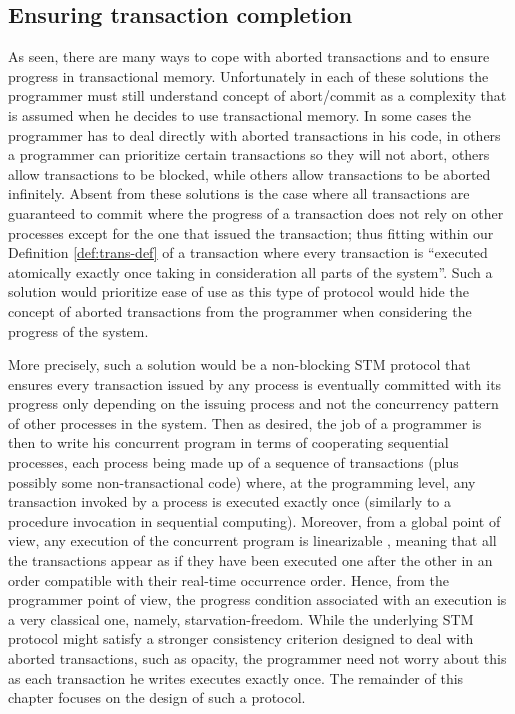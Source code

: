 \subsection{Ensuring transaction completion}
As seen, there are many ways to cope with aborted transactions
and to ensure progress in transactional memory.
Unfortunately in each of these solutions the programmer must still understand
concept of abort/commit as a complexity that is assumed when he decides to use
transactional memory.
In some cases the programmer has to deal directly with aborted transactions
in his code, in others a programmer can prioritize certain transactions
so they will not abort, others allow transactions to be blocked, while
others allow transactions to be aborted infinitely.
Absent from these solutions is the case where all transactions are guaranteed to
commit where the progress of a transaction does not rely on
other processes except for the one that issued the transaction; thus
fitting within our Definition \ref{def:trans-def} of a transaction
where every transaction is ``executed atomically exactly once
taking in consideration all parts of the system''.
Such a solution would prioritize ease of use as this type of protocol would hide
the concept of aborted transactions from the programmer when considering
the progress of the system.

More precisely, such a solution would be a non-blocking STM protocol that ensures every transaction
issued by any process is eventually committed with its progress only depending
on the issuing process and not the concurrency pattern of other processes in the system.
Then as desired, the job of a
programmer is then to write his concurrent program in terms of cooperating sequential
processes, each process being made up of a sequence of transactions (plus possibly
some non-transactional code) where,
at the programming level, any transaction invoked by
a process is executed exactly once (similarly to a procedure invocation in sequential
computing).
Moreover, from a global point of view, any execution of the concurrent
program is linearizable \cite{HW90}, meaning that all the transactions appear as if they have
been executed one after the other in an order compatible with their real-time occurrence
order. Hence, from the programmer point of view, the progress condition associated
with an execution is a very classical one, namely, starvation-freedom.
While the underlying STM protocol might satisfy a stronger consistency criterion
designed to deal with aborted transactions,
such as opacity, the programmer need not worry about this as each transaction
he writes executes exactly once.
The remainder of this chapter focuses on the design of such a protocol.


